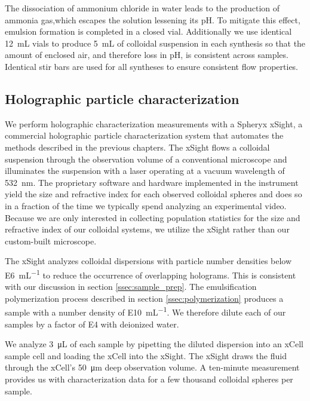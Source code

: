 The dissociation of ammonium chloride in water leads to the production of ammonia
gas,which escapes the solution lessening its pH.
To mitigate this effect, emulsion formation is completed in a closed vial.
Additionally we use identical \SI{12}{\milli\liter} vials to produce \SI{5}{\milli\liter}
of colloidal suspension in each synthesis so that the amount of enclosed air, and therefore
loss in pH, is consistent across samples. Identical stir bars are used for all syntheses
to ensure consistent flow properties.

\subsection{Holographic particle characterization}

We perform holographic characterization measurements with a Spheryx xSight,
a commercial holographic particle characterization system
that automates the methods described in the previous chapters.
The xSight flows a colloidal suspension through the observation volume of a conventional microscope
and illuminates the suspension with a laser operating at a vacuum wavelength of \SI{532}{\nm}.
The proprietary software and hardware implemented in
the instrument yield the size and refractive index for each observed colloidal spheres and
does so in a fraction of the time we typically spend analyzing an experimental video.
Because we are only interested in collecting population statistics for the size and refractive
index of our colloidal systems, we utilize the xSight rather than our custom-built microscope.

The xSight analyzes colloidal dispersions with particle number densities below 
\SI{E6}{\milli\liter^{-1}} to reduce the occurrence of overlapping holograms.
This is consistent with our discussion in section \ref{ssec:sample_prep}.
The emulsification polymerization process described in section \ref{ssec:polymerization}
produces a sample with a number density of \SI{E10}{\milli\liter^{-1}}.
We therefore dilute each of our samples by a factor of \SI{E4}{} with
deionized water.

We analyze \SI{3}{\micro\liter} of each sample by pipetting the diluted dispersion into an
xCell sample cell and loading the xCell into the xSight. The xSight draws the fluid through
the xCell's \SI{50}{\um} deep observation volume. A ten-minute measurement provides us with
characterization data for a few thousand colloidal spheres per sample.


